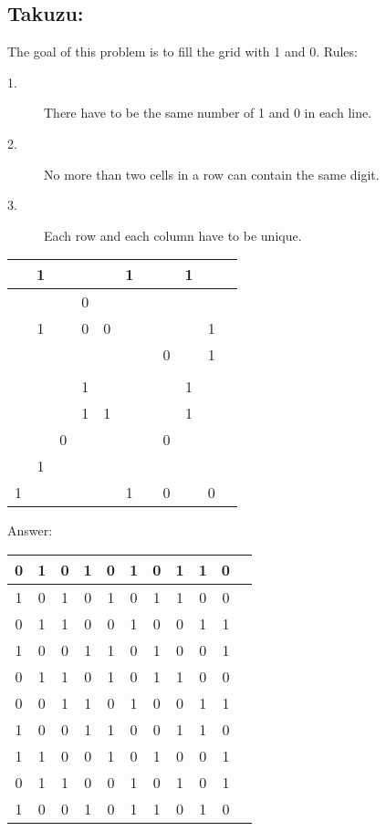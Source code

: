 \documentclass{article}
\begin{document}
\subsection*{Takuzu:}
The goal of this problem is to fill the grid with 1 and 0. 
Rules:
\begin{description}
\item[1.] There have to be the same number of 1 and 0 in each line.
\item[2.] No more than two cells in a row can contain the same digit.
\item[3.] Each row and each column have to be unique.
\end{description}

\begin{table}[ht]
\centering
\begin{tabular}{|c|c|c|c|c|c|c|c|c|c|c|}
\hline   & 1 &   &   &   & 1 &   &   & 1 &   \\ 
\hline   &   &   & 0 &   &   &   &   &   &   \\ 
\hline   & 1 &   & 0 & 0 &   &   &   &   & 1 \\ 
\hline   &   &   &   &   &   &   & 0 &   & 1 \\ 
\hline   &   &   &   &   &   &   &   &   &   \\ 
\hline   &   &   & 1 &   &   &   &   & 1 &   \\ 
\hline   &   &   & 1 & 1 &   &   &   & 1 &   \\ 
\hline   &   & 0 &   &   &   &   & 0 &   &   \\ 
\hline   & 1 &   &   &   &   &   &   &   &   \\ 
\hline 1 &   &   &   &   & 1 &   & 0 &   & 0 \\
\hline
\end{tabular}
\end{table} 

Answer:
\begin{table}[ht]
\centering
\begin{tabular}{|c|c|c|c|c|c|c|c|c|c|c|}
\hline 0 & 1 & 0 & 1 & 0 & 1 & 0 & 1 & 1 & 0 \\ 
\hline 1 & 0 & 1 & 0 & 1 & 0 & 1 & 1 & 0 & 0 \\ 
\hline 0 & 1 & 1 & 0 & 0 & 1 & 0 & 0 & 1 & 1 \\ 
\hline 1 & 0 & 0 & 1 & 1 & 0 & 1 & 0 & 0 & 1 \\ 
\hline 0 & 1 & 1 & 0 & 1 & 0 & 1 & 1 & 0 & 0 \\ 
\hline 0 & 0 & 1 & 1 & 0 & 1 & 0 & 0 & 1 & 1 \\ 
\hline 1 & 0 & 0 & 1 & 1 & 0 & 0 & 1 & 1 & 0 \\ 
\hline 1 & 1 & 0 & 0 & 1 & 0 & 1 & 0 & 0 & 1 \\ 
\hline 0 & 1 & 1 & 0 & 0 & 1 & 0 & 1 & 0 & 1 \\ 
\hline 1 & 0 & 0 & 1 & 0 & 1 & 1 & 0 & 1 & 0 \\
\hline
\end{tabular}
\end{table} 
\end{document}
